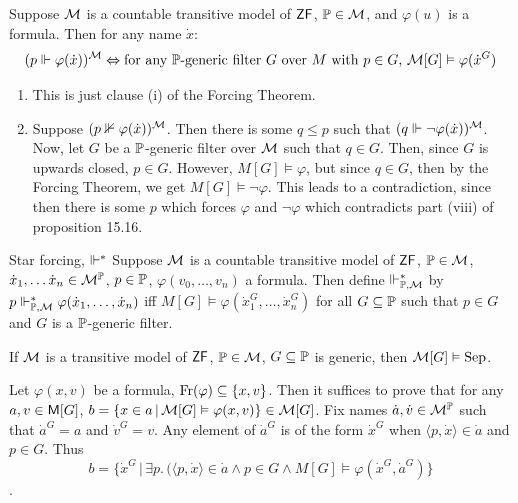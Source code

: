 \documentclass{article}
\begin{document}
    \begin{corr}{}
        Suppose $\mathcal{M}$ is a countable transitive model of $\mathsf{ZF}$, $\mathbb{P} \in \mathcal{M}$, and $\varphi(u)$ is a formula. Then for any name $\dot{x}$: \[ (p \Vdash \varphi(\dot{x}))^{\mathcal{M}} \Leftrightarrow \text{for any $\mathbb{P}$-generic filter $G$ over $M$ with $p \in G$, $\mathcal{M}[G] \vDash \varphi(\dot{x}^{G})$}\]
    \end{corr}
    \proof \hspace{0.1cm}
    \begin{enumerate}
        \item[($\Rightarrow$)] This is just clause (i) of the Forcing Theorem.
        \item[($\Leftarrow$)] Suppose $(p \nVdash \varphi(\dot{x}))^{\mathcal{M}}$. Then there is some $q \leq p$ such that $(q \Vdash \neg \varphi(\dot{x}))^{\mathcal{M}}$. Now, let $G$ be a $\mathbb{P}$-generic filter over $\mathcal{M}$ such that $q \in G$. Then, since $G$ is upwards closed, $p \in G$. However, $M[G] \models \varphi$, but since $q \in G$, then by the Forcing Theorem, we get $M[G] \models \neg \varphi$. This leads to a contradiction, since then there is some $p$ which forces $\varphi$ and $\neg \varphi$ which contradicts part (viii) of proposition 15.16.
    \end{enumerate}
    \endproof
    \begin{fancydefine}{Star forcing, $\Vdash^{*}$}
        Suppose $\mathcal{M}$ is a countable transitive model of $\mathsf{ZF}$, $\mathbb{P} \in \mathcal{M}$, $\dot{x}_{1}, \dots \dot{x}_{n} \in \mathcal{M}^{\mathbb{P}}$, $p \in \mathbb{P}$, $\varphi(v_{0},\dots, v_{n})$ a formula. Then define $\Vdash_{\mathbb{P},\mathcal{M}}^{*}$ by $p \Vdash_{\mathbb{P},\mathcal{M}}^{*} \varphi(\dot{x}_{1},\dots,\dot{x}_{n})$ iff $M[G] \models \varphi(\dot{x}_{1}^{G},\dots,\dot{x}_{n}^{G})$ for all $G \subseteq \mathbb{P}$ such that $p \in G$ and $G$ is a $\mathbb{P}$-generic filter.
    \end{fancydefine}
    \newlec
    \begin{fancylem}{}
        If $\mathcal{M}$ is a transitive model of $\mathsf{ZF}$, $\mathbb{P} \in \mathcal{M}$, $G \subseteq \mathbb{P}$ is generic, then $\mathcal{M}[G] \vDash \text{Sep}$.
    \end{fancylem}
    \proof Let $\varphi(x,v)$ be a formula, $\operatorname{Fr}(\varphi) \subseteq \{x,v\}$. Then it suffices to prove that for any $a,v \in \mathsf{M}[G]$, $b = \{ x \in a \, | \, \mathcal{M}[G] \vDash \varphi(x,v)\} \in \mathcal{M}[G]$. Fix names $\dot{a}, \dot{v} \in \mathcal{M}^{\mathbb{P}}$ such that $\dot{a}^{G}=a$ and $\dot{v}^{G}=v$. \gap
    Any element of $\dot{a}^{G}$ is of the form $\dot{x}^{G}$ when $\langle p, \dot{x} \rangle \in \dot{a}$ and $p \in G$. Thus \[b = \{ \dot{x}^{G} \, | \, \exists p. \, (\langle p, \dot{x} \rangle \in \dot{a} \wedge p \in G \wedge M[G] \models \varphi(\dot{x}^{G},\dot{a}^{G})\}\].
\end{document}
